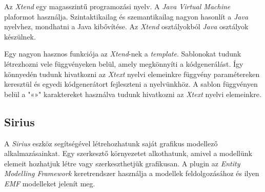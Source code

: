 Az \textit{Xtend} egy magasszintű programozási nyelv.
A \textit{Java Virtual Machine} plaformot használja.
Szintaktikailag és szemantikailag nagyon hasonlít a \textit{Java} nyelvhez, mondhatni a Java kibővítése.
Az \textit{Xtend} osztályokból \textit{Java} osztályok készülnek.

Egy nagyon hasznos funkciója az \textit{Xtend}-nek a \textit{template}.
Sablonokat tudunk létrezhozni vele függvényeken belül, amely megkönnyíti a kódgenerálást.
Így könnyedén tudunk hivatkozni az \textit{Xtext} nyelvi elemeinkre függvény paramétereken keresztül és egyedi kódgenerátort fejleszteni a nyelvünkhöz.
A sablon függvényen belül a "«»" karaktereket használva tudunk hivatkozni az \textit{Xtext} nyelvi elemeinkre.

\subsection{Sirius}

A \textit{Sirius} eszköz segítségével létrehozhatunk saját grafikus modellező alkalmazásainkat.
Egy szerkesztő környezetet alkothatunk, amivel a modellünk elemeit hozhatjuk létre vagy szerkeszthetjük grafikusan.
A plugin az \textit{Entity Modelling Framework} keretrendszer használja a modellek feldolgozásához és ilyen \textit{EMF} modelleket jelenít meg.
